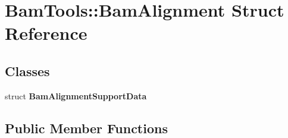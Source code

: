 \hypertarget{structBamTools_1_1BamAlignment}{\section{Bam\-Tools\-:\-:Bam\-Alignment Struct Reference}
\label{structBamTools_1_1BamAlignment}
}
\subsection*{Classes}
\begin{DoxyCompactItemize}
\item 
struct {\bfseries Bam\-Alignment\-Support\-Data}
\end{DoxyCompactItemize}
\subsection*{Public Member Functions}
